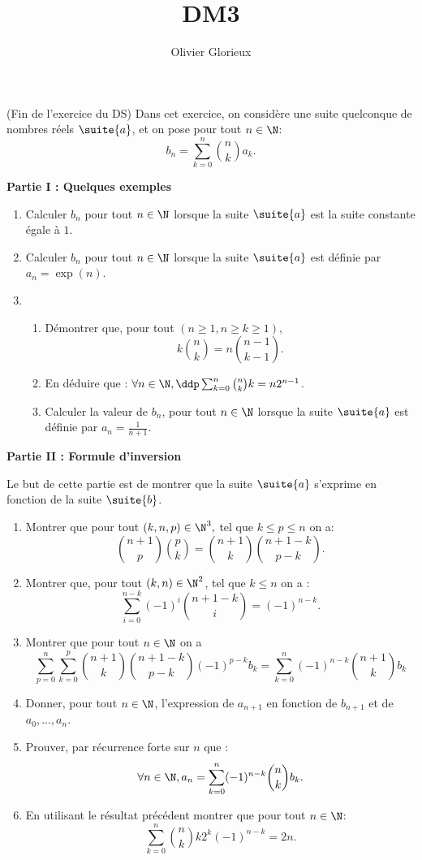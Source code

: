 \documentclass[a4paper, 11pt,reqno]{article}
\author{Olivier Glorieux}
\begin{document}
\title{DM3 \\
}
\begin{exercice}(Fin de l'exercice du DS) 
Dans cet exercice, on considère une suite quelconque de nombres réels $\suite{a}$, et on pose pour tout $n\in \N$:
$$b_n =\sum_{k=0}^n \binom{n}{k} a_k.$$
\begin{center}
\textbf{Partie I : Quelques exemples}
\end{center}
\begin{enumerate}
\item Calculer $b_n$ pour tout $n \in \N$ lorsque la suite $\suite{a}$ est la suite constante égale à $1$.
\item Calculer $b_n$ pour tout $n \in \N$ lorsque la suite $\suite{a}$ est définie par $a_n=\exp(n)$. 

\item 
\begin{enumerate}
\item Démontrer que, pour tout $(n\geq 1,n\geq k\geq 1)$, $$k\binom{n}{k}=n \binom{n-1}{k-1}.$$
\item En déduire que : $\forall n \in \N, \ddp \sum_{k=0}^n \binom{n}{k} k = n2^{n-1}$.
\item Calculer la valeur de $b_n$, pour tout $n \in \N$ lorsque la suite $\suite{a}$ est définie par $a_n=\frac{1}{n+1}$. 
\end{enumerate}
\end{enumerate}
\begin{center}
\textbf{Partie II : Formule d'inversion }
\end{center}
Le  but de cette partie est de montrer que la suite $\suite{a}$ s'exprime en fonction de la suite $\suite{b}$. 
\begin{enumerate}
\item Montrer que pour tout $(k, n , p ) \in \N^3,$ tel que $k\leq p \leq n$ on  a:
$$\binom{n+1}{p}\binom{p}{k}=\binom{n+1}{k}\binom{n+1-k}{p-k}.$$
\item Montrer que, pour tout $(k,n) \in \N^2$, tel que $k\leq n$ on  a :
$$\sum_{i=0}^{n-k} (-1)^i  \binom{n+1-k}{i}=(-1)^{n-k}.$$ 
\item  Montrer que pour tout $n\in \N$ on a $$\sum_{p=0}^{n}\sum_{k=0}^p  \binom{n+1}{k}\binom{n+1-k}{p-k} (-1)^{p-k}  b_k	 = \sum_{k=0}^{n} (-1)^{n-k}  \binom{n+1}{k} b_k $$
\item Donner, pour tout $n\in \N$, l'expression de $a_{n+1}$ en fonction de $b_{n+1}$ et de $a_0, ..., a_n$. 
\item Prouver, par récurrence forte sur $n$ que :
$$\forall n \in \N, a_n =\sum_{k=0}^n (-1)^{n-k} \binom{n}{k} b_k.$$
\item En utilisant le résultat précédent montrer que pour tout $n\in \N$:
$$\sum_{k=0}^{n}   \binom{n}{k}k2^k(-1)^{n-k}=2n.$$ 
\end{enumerate}




\end{exercice}
\end{document}

